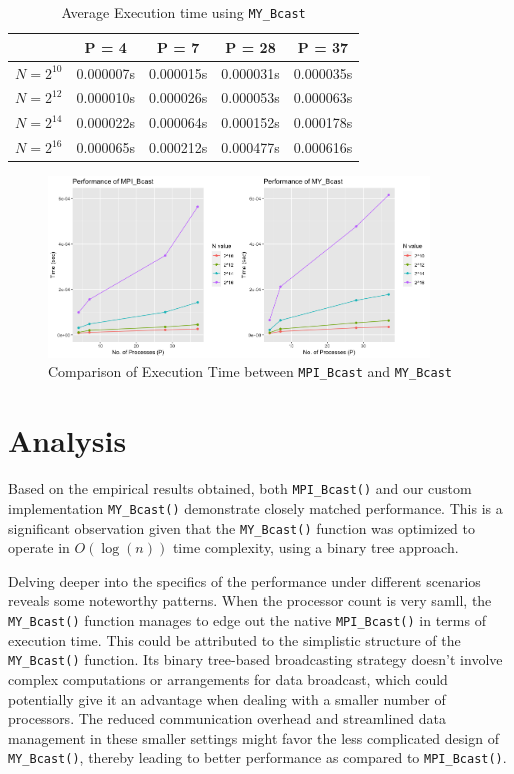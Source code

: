 \documentclass[12pt,a4paper]{article}
\begin{document}
\begin{table}[!htb]
   \centering    
   \begin{tabular}{|c|c|c|c|c|}    
   \hline    
   & P = 4 & P = 7 & P = 28 & P = 37 \\   
   \hline    
   $N = 2^{10}$ & 0.000007s & 0.000015s & 0.000031s & 0.000035s \\   
   \hline    
   $N = 2^{12}$ & 0.000010s & 0.000026s & 0.000053s & 0.000063s \\   
   \hline    
   $N = 2^{14}$ & 0.000022s & 0.000064s & 0.000152s & 0.000178s \\   
   \hline    
   $N = 2^{16}$ & 0.000065s & 0.000212s & 0.000477s & 0.000616s \\   
   \hline    
   \end{tabular}    
   \caption{Average Execution time using \texttt{MY\_Bcast}}    
   \label{tab:my_bcast}
\end{table}

\begin{figure}
    \centering
    \includegraphics[width=0.9\textwidth]{Rplot01.png}
    \caption{Comparison of Execution Time between \texttt{MPI\_Bcast} and \texttt{MY\_Bcast}}
\end{figure}


\section{Analysis}

Based on the empirical results obtained,
 both \texttt{MPI\_Bcast()} and our custom implementation
 \texttt{MY\_Bcast()} demonstrate closely matched performance. 
This is a significant observation given that the \texttt{MY\_Bcast()} function 
 was optimized to operate in \(O(\log(n))\) time complexity, 
 using a binary tree approach.

Delving deeper into the specifics of the performance under different scenarios 
 reveals some noteworthy patterns.
When the processor count is very samll, the \texttt{MY\_Bcast()} function manages
 to edge out the native \texttt{MPI\_Bcast()} in terms of execution time. 
This could be attributed to the simplistic structure of the \texttt{MY\_Bcast()} function. 
Its binary tree-based broadcasting strategy doesn't involve complex computations 
 or arrangements for data broadcast, 
 which could potentially give it an advantage when dealing with a 
 smaller number of processors. 
The reduced communication overhead and streamlined data management in 
 these smaller settings might favor the less complicated design 
 of \texttt{MY\_Bcast()}, thereby leading to better performance 
 as compared to \texttt{MPI\_Bcast()}.
\end{document}
